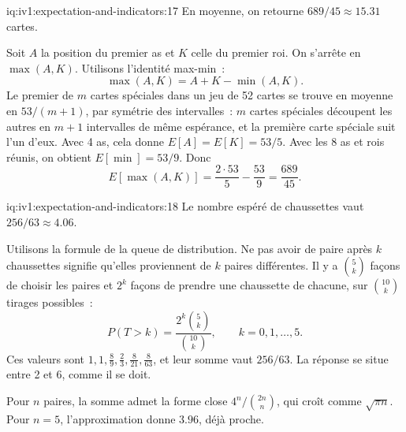 \begin{solution}{iq:iv1:expectation-and-indicators:17}
En moyenne, on retourne $689/45 \approx 15.31$ cartes.

Soit $A$ la position du premier as et $K$ celle du premier roi. On s'arrête en $\max(A, K)$. Utilisons l'identité max-min~:
\[
\max(A, K) = A + K - \min(A, K).
\]
Le premier de $m$ cartes spéciales dans un jeu de 52 cartes se trouve en moyenne en $53/(m+1)$, par symétrie des intervalles~: $m$ cartes spéciales découpent les autres en $m+1$ intervalles de
même espérance, et la première carte spéciale suit l'un d'eux. Avec 4 as, cela donne $E[A] = E[K] = 53/5$. Avec les 8 as et rois réunis, on obtient
$E[\min] = 53/9$. Donc
\[
E[\max(A, K)] = \frac{2 \cdot 53}{5} - \frac{53}{9} = \frac{689}{45}.
\]
\end{solution}

\begin{solution}{iq:iv1:expectation-and-indicators:18}
Le nombre espéré de chaussettes vaut $256/63 \approx 4.06$.

Utilisons la formule de la queue de distribution. Ne pas avoir de paire après $k$ chaussettes signifie qu'elles proviennent de $k$ paires différentes. Il y a $\binom{5}{k}$ façons de choisir les paires et $2^k$ façons
de prendre une chaussette de chacune, sur $\binom{10}{k}$ tirages possibles~:
\[
P(T > k) = \frac{2^k \binom{5}{k}}{\binom{10}{k}}, \qquad k = 0, 1, \dots, 5.
\]
Ces valeurs sont $1, 1, \tfrac89, \tfrac23, \tfrac{8}{21}, \tfrac{8}{63}$, et leur somme vaut $256/63$. La réponse se situe entre 2 et 6, comme il se doit.

Pour $n$ paires, la somme admet la forme close $4^n / \binom{2n}{n}$, qui croît comme $\sqrt{\pi n}$. Pour $n = 5$, l'approximation donne $3.96$,
déjà proche.

\end{solution}

